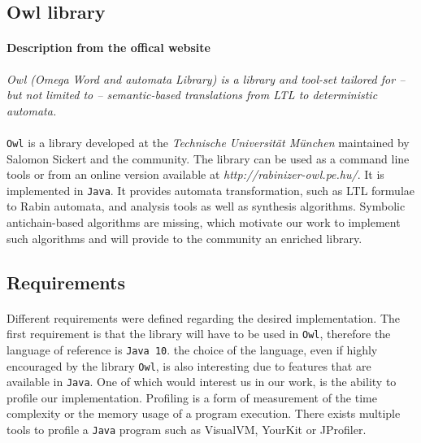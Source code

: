 \documentclass[11pt,a4paper]{article}
\theoremstyle{definition}
\begin{document}
\subsection{Owl library}

\label{sec:owl}

\paragraph{Description from the offical website \cite{owl}}
\textit{Owl (Omega Word and automata Library)
is a library and tool-set tailored for – but not
limited to – semantic-based translations
from LTL to deterministic automata.}

\paragraph{}

\texttt{Owl} is a library developed at the
\textit{Technische Universität München}
maintained by Salomon Sickert and the community.
The library can be used as a command line tools or from an
online version available at \textit{http://rabinizer-owl.pe.hu/}.
It is implemented in \texttt{Java}.
It provides automata transformation, such as LTL formulae
to Rabin automata, and analysis
tools as well as synthesis algorithms.
Symbolic antichain-based algorithms are missing, which motivate
our work to implement such algorithms and will provide
to the community an enriched library.



\subsection{Requirements}

\paragraph{}


Different requirements were defined regarding the desired implementation.
The first requirement is that the library will have to be used in
\texttt{Owl}, therefore the language of reference is \texttt{Java 10}.
the choice of the language, even if highly encouraged by
the library \texttt{Owl}, is also interesting due to features that
are available in \texttt{Java}. One of which would interest us
in our work, is the ability to profile our implementation.
Profiling is a form of measurement of the time complexity or
the memory usage of a program execution. There exists multiple
tools to profile a \texttt{Java} program such as VisualVM, YourKit
or JProfiler.
\end{document}
